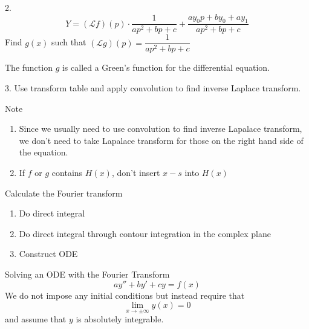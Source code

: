\documentclass{beamer}
\begin{document}
\begin{frame}
\begin{block}{2.}
$$Y=(\mathscr{L}f)(p)\cdot\dfrac{1}{ap^2+bp+c}+\dfrac{ay_0p+by_0+ay_1}{ap^2+bp+c}$$
Find $g(x)$ such that $(\mathscr{L}g)(p)=\dfrac{1}{ap^2+bp+c}$

The function $g$ is called a Green's function for the differential
equation.
\end{block}
\begin{block}{3. }
Use transform table and apply convolution to find inverse Laplace transform.
\end{block}
\end{frame}

\begin{frame}
\begin{block}{Note}
\begin{enumerate}
\item Since we usually need to use convolution to find inverse Lapalace transform, we don't need to take Lapalace transform for those on the right hand side of the equation.
\item If $f$ or $g$ contains $H(x)$, don't insert $x-s$ into $H(x)$
\end{enumerate}
\end{block}
\end{frame}
\begin{frame}
\begin{block}{Calculate the Fourier transform}
\begin{enumerate}
\item Do direct integral
\item Do direct integral through contour integration in
the complex plane
\item Construct ODE 

\end{enumerate}

\end{block}
\end{frame}

\begin{frame}
\begin{block}{Solving an ODE with the Fourier Transform}
$$ay''+by'+cy=f(x) $$
We do not impose any initial conditions but instead require that
$$\lim\limits_{x\rightarrow\pm\infty}y(x) = 0$$
and assume that $y$ is absolutely integrable.

\end{block}

\end{frame}
\end{document}
